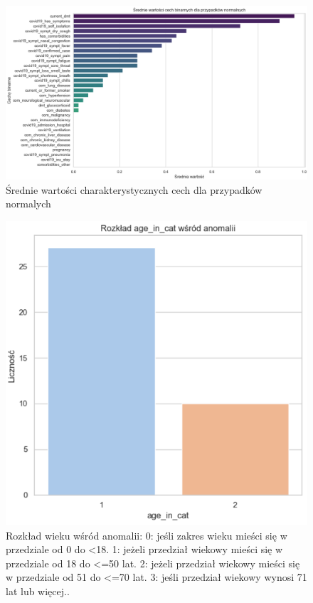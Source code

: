\documentclass[a4paper,fleqn]{cas-dc}
\begin{document}
\begin{figure}[h]
	\includegraphics[scale=.35]{wykresy/wykres5.png}
	\caption{Średnie wartości charakterystycznych cech dla przypadków normalych}
	\label{FIG:1}
\end{figure}

\begin{figure}[h]
	\includegraphics[scale=.73]{wykresy/wykres6.png}
	\caption{Rozkład wieku wśród anomalii: 0: jeśli zakres wieku mieści się w przedziale od 0 do <18. 
1: jeżeli przedział wiekowy mieści się w przedziale od 18 do <=50 lat.
2: jeżeli przedział wiekowy mieści się w przedziale od 51 do <=70 lat.
3: jeśli przedział wiekowy wynosi 71 lat lub więcej..}
	\label{FIG:1}
\end{figure}
\end{document}
